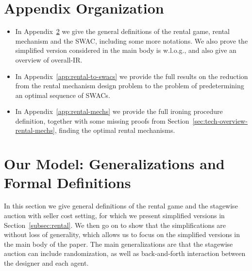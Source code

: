 \documentclass[11pt,letterpaper]{article}
\newcommand{\oir}{overall-IR\xspace}
\newcommand{\swac}{SWAC\xspace}
\newcommand{\swacs}{SWACs\xspace}
\theoremstyle{plain}
\begin{document}




\appendix
\section{Appendix Organization}
\begin{itemize}
    \item In Appendix~\ref{app:generelizations-and-definitions} we give the general definitions of the rental game, rental mechanism and the \swac, including some more notations. We also prove the simplified version considered in the main body is w.l.o.g., and also give an overview of \oir.
    \item In Appendix~\ref{app:rental-to-swacs} we provide the full results on the reduction from the rental mechanism design problem to the problem of predetermining an optimal sequence of \swacs.
    \item In Appendix~\ref{app:rental-mechs} we provide the full ironing procedure definition, together with some missing proofs from Section~\ref{sec:tech-overview-rental-mechs}, finding the optimal rental mechanisms.
\end{itemize}



% 

\section{Our Model: Generalizations and Formal Definitions}\label{app:generelizations-and-definitions}
In this section we give general definitions of the rental game and the stagewise auction with seller cost setting, for which we present simplified versions in Section~\ref{subsec:rental}. We then go on to show that the simplifications are without loss of generality, which allows us to focus on the simplified versions in the main body of the paper. The main generalizations are that the stagewise auction can include randomization, as well as back-and-forth interaction between the designer and each agent.
\end{document}
